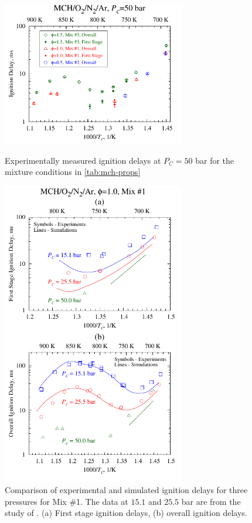 \documentclass[12pt, letterpaper]{article}
\begin{document}
\begin{figure}
    \centering
    \begin{minipage}{0.45\textwidth}
        \includegraphics[width=8cm]{../figures/05-MCH/mch-expts}
        \caption{Experimentally measured ignition delays at $P_C=50$ bar for the
            mixture conditions in \autoref{tab:mch-props}}
        \label{fig:mch-expts}
    \end{minipage}
    \quad
    \begin{minipage}{0.45\textwidth}
        \includegraphics[width=8cm]{../figures/05-MCH/mch-model-1}
        \caption{Comparison of experimental and simulated ignition delays for three
            pressures for Mix \#1. The data at $15.1$ and $25.5$ bar are from the
            study of \textcite{Mittal2009}. (a) First stage ignition delays,
            (b) overall ignition delays.}
        \label{fig:mch-model-1}
    \end{minipage}
\end{figure}
\end{document}
